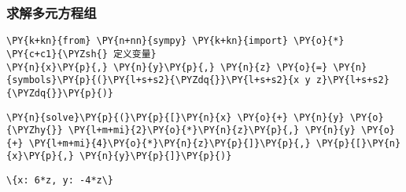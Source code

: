     \hypertarget{ux6c42ux89e3ux591aux5143ux65b9ux7a0bux7ec4}{%
\subsubsection{求解多元方程组}\label{ux6c42ux89e3ux591aux5143ux65b9ux7a0bux7ec4}}

    \begin{tcolorbox}[breakable, size=fbox, boxrule=1pt, pad at break*=1mm,colback=cellbackground, colframe=cellborder]
\begin{Verbatim}[commandchars=\\\{\}]
\PY{k+kn}{from} \PY{n+nn}{sympy} \PY{k+kn}{import} \PY{o}{*}
\PY{c+c1}{\PYZsh{} 定义变量}
\PY{n}{x}\PY{p}{,} \PY{n}{y}\PY{p}{,} \PY{n}{z} \PY{o}{=} \PY{n}{symbols}\PY{p}{(}\PY{l+s+s2}{\PYZdq{}}\PY{l+s+s2}{x y z}\PY{l+s+s2}{\PYZdq{}}\PY{p}{)}
\end{Verbatim}
\end{tcolorbox}

    \begin{tcolorbox}[breakable, size=fbox, boxrule=1pt, pad at break*=1mm,colback=cellbackground, colframe=cellborder]
\begin{Verbatim}[commandchars=\\\{\}]
\PY{n}{solve}\PY{p}{(}\PY{p}{[}\PY{n}{x} \PY{o}{+} \PY{n}{y} \PY{o}{\PYZhy{}} \PY{l+m+mi}{2}\PY{o}{*}\PY{n}{z}\PY{p}{,} \PY{n}{y} \PY{o}{+} \PY{l+m+mi}{4}\PY{o}{*}\PY{n}{z}\PY{p}{]}\PY{p}{,} \PY{p}{[}\PY{n}{x}\PY{p}{,} \PY{n}{y}\PY{p}{]}\PY{p}{)}
\end{Verbatim}
\end{tcolorbox}

            \begin{tcolorbox}[breakable, size=fbox, boxrule=.5pt, pad at break*=1mm, opacityfill=0]
\begin{Verbatim}[commandchars=\\\{\}]
\{x: 6*z, y: -4*z\}
\end{Verbatim}
\end{tcolorbox}
